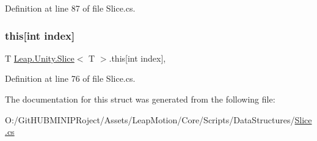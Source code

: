 Definition at line 87 of file Slice.\+cs.

\mbox{\label{struct_leap_1_1_unity_1_1_slice_af8670392523e20ba513a6dcd8455cf1b}} 
\subsubsection{\texorpdfstring{this[int index]}{this[int index]}}
{\footnotesize\ttfamily T \mbox{\hyperlink{struct_leap_1_1_unity_1_1_slice}{Leap.\+Unity.\+Slice}}$<$ T $>$.this\mbox{[}int index\mbox{]}\hspace{0.3cm}{\ttfamily [get]}, {\ttfamily [set]}}



Definition at line 76 of file Slice.\+cs.



The documentation for this struct was generated from the following file\+:\begin{DoxyCompactItemize}
\item 
O\+:/\+Git\+H\+U\+B\+M\+I\+N\+I\+P\+Roject/\+Assets/\+Leap\+Motion/\+Core/\+Scripts/\+Data\+Structures/\mbox{\hyperlink{_slice_8cs}{Slice.\+cs}}\end{DoxyCompactItemize}
